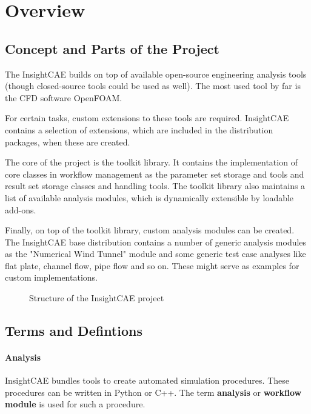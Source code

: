 \section{Overview}

\subsection{Concept and Parts of the Project}

The InsightCAE builds on top of available open-source engineering analysis tools (though closed-source tools could be used as well). The most used tool by far is the CFD software OpenFOAM.

For certain tasks, custom extensions to these tools are required. InsightCAE contains a selection of extensions, which are included in the distribution packages, when these are created.

The core of the project is the toolkit library. It contains the implementation of core classes in workflow management as the parameter set storage and tools and result set storage classes and handling tools.
The toolkit library also maintains a list of available analysis modules, which is dynamically extensible by loadable add-ons.

Finally, on top of the toolkit library, custom analysis modules can be created.
The InsightCAE base distribution contains a number of generic analysis modules as the "Numerical Wind Tunnel" module and some generic test case analyses like flat plate, channel flow, pipe flow and so on. These might serve as examples for custom implementations.


\begin{figure}[h!]
\centering

\caption{Structure of the InsightCAE project}
\label{fig:insightcae-structure}
\end{figure}


\subsection{Terms and Defintions}

\paragraph{Analysis}

InsightCAE bundles tools to create automated simulation procedures. These procedures can be written in Python or C++. The term \textbf{analysis} or \textbf{workflow module} is used for such a procedure.

